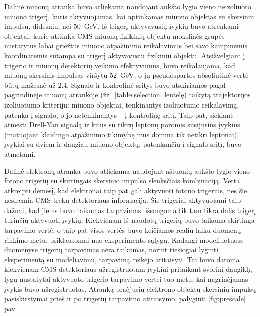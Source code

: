 \documentclass[a4paper, 12pt, oneside]{article}
\begin{document}
Dalinė miuonų atranka buvo atliekama naudojant aukšto lygio vieno neizoliuoto miuono trigerį, kuris aktyvuojamas,
kai aptinkamas miuono objektas su skersiniu impulsu, didesniu, nei $50$~GeV.
Iš trigerį aktyvavusių įvykių buvo atrenkami objektai, kurie atitinka CMS miuonų fizikinių objektų mokslinės grupės nustatytus
labai griežtus miuono atpažinimo reikalavimus bei savo kampinėmis koordinatėmis sutampa su trigerį aktyvavusiu fizikiniu objektu.
Atsižvelgiant į trigerio ir miuonų detektorių veikimo efektyvumus, buvo reikalaujama, kad miuonų skersinis impulsas viršytų
$52$~GeV, o jų pseudospartos absoliutinė vertė būtų mažesnė už $2.4$.
Signalo ir kontrolinė sritys buvo atskiriamos pagal pagrindinėje miuonų atrankoje (žr.\ \ref{table:selection} lentelę) taikytą
trajektorijos izoliuotumo kriterijų: miuono objektai, tenkinantys izoliuotumo reikalavimą, patenka į signalo, o jo netenkinantys --
į kontrolinę sritį.
Taip pat, siekiant atmesti Drell-Yan signalą ir kitus su tikrų leptonų poromis susijusius įvykius (matuojant klaidingo
atpažinimo tikimybę mus domina tik netikri leptonai), įvykiai su dviem ir daugiau miuono objektų, patenkančių į signalo sritį,
buvo atmetami.

Dalinė elektronų atranka buvo atliekama naudojant aštuonių aukšto lygio vieno fotono trigerių su skirtingais skersinio impulso
slenksčiais kombinaciją.
Verta atkreipti dėmesį, kad elektronai taip pat gali aktyvuoti fotono trigerius, nes šie nesiremia CMS trekų detektoriaus informacija.
Šie trigeriai aktyvuojami taip dažnai, kad jiems buvo taikomas tarpavimas: išsaugoma tik tam tikra dalis trigerį turinčių
aktyvuoti įvykių.
Kiekvienam iš naudotų trigerių buvo taikoma skirtinga tarpavimo vertė, o taip pat visos vertės buvo keičiamos realiu laiku duomenų
rinkimo metu, priklausomai nuo eksperimento sąlygų.
Kadangi modeliuotuose duomenyse trigerių tarpavimas nėra taikomas, norint tiesiogiai lyginti eksperimentą su modeliavimu,
tarpavimą reikėjo atitaisyti.
Tai buvo daroma kiekvienam CMS detektoriaus užregistruotam įvykiui pritaikant svorinį daugiklį, lygų nustatytai aktyvuoto
trigerio tarpavimo vertei tuo metu, kai nagrinėjamas įvykis buvo užregistruotas.
Atranką praėjusių elektrono objektų skersinių impulsų pasiskirstymai prieš ir po trigerių tarpavimo atitaisymo, palyginti
\ref{fig:prescale} pav.
\end{document}
